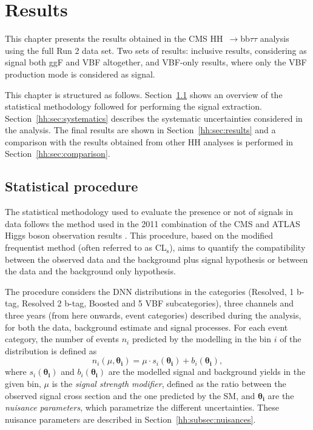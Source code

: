 \documentclass[../main.tex]{subfiles}
\begin{document}
\chapter{Results}
\label{hh:chapter:results}

This chapter presents the results obtained in the CMS HH~$\to$bb$\tau\tau$ analysis using the full Run 2 data set. Two sets of results: inclusive results, considering as signal both ggF and VBF altogether, and VBF-only results, where only the VBF production mode is considered as signal. 

This chapter is structured as follows. Section~\ref{hh:sec:stat} shows an overview of the statistical methodology followed for performing the signal extraction. Section~\ref{hh:sec:systematics} describes the systematic uncertainties considered in the analysis. The final results are shown in Section~\ref{hh:sec:results} and a comparison with the results obtained from other HH analyses is performed in Section~\ref{hh:sec:comparison}.

\section{Statistical procedure}
\label{hh:sec:stat}

The statistical methodology used to evaluate the presence or not of signals in data follows the method used in the 2011 combination of the CMS and ATLAS Higgs boson observation results \cite{hh:results:statistical_model}. This procedure, based on the modified frequentist method (often referred to as CL${}_\text{s}$), aims to quantify the compatibility between the observed data and the background plus signal hypothesis or between the data and the background only hypothesis. 

The procedure considers the DNN distributions in the categories (Resolved, 1 b-tag, Resolved 2 b-tag, Boosted and 5 VBF subcategories), three channels and three years (from here onwards, event categories) described during the analysis, for both the data, background estimate and signal processes. For each event category, the number of events $n_i$ predicted by the modelling in the bin $i$ of the distribution is defined as
\begin{equation}
n_i(\mu, \boldsymbol{\theta_i})=\mu\cdot s_i (\boldsymbol{\theta_i}) + b_i(\boldsymbol{\theta_i}),
\end{equation}
where $s_i (\boldsymbol{\theta_i})$ and $b_i(\boldsymbol{\theta_i})$ are the modelled signal and background yields in the given bin, $\mu$ is the \textit{signal strength modifier}, defined as the ratio between the observed signal cross section and the one predicted by the SM, and $\boldsymbol{\theta_i}$ are the \textit{nuisance parameters}, which parametrize the different uncertainties. These nuisance parameters are described in Section~\ref{hh:subsec:nuisances}.
\end{document}
